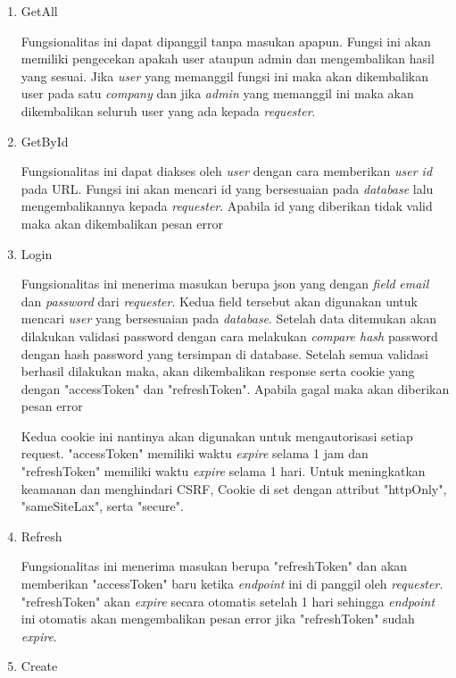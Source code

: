 \begin{enumerate}
  \item GetAll

        Fungsionalitas ini dapat dipanggil tanpa masukan apapun. Fungsi ini akan memiliki pengecekan apakah user ataupun admin dan mengembalikan hasil yang sesuai. Jika \textit{user} yang memanggil fungsi ini maka akan dikembalikan user pada satu \textit{company} dan jika \textit{admin} yang memanggil ini maka akan dikembalikan seluruh user yang ada kepada \textit{requester}.

  \item GetById

        Fungsionalitas ini dapat diakses oleh \textit{user} dengan cara memberikan \textit{user id} pada URL. Fungsi ini akan mencari id yang bersesuaian pada \textit{database} lalu mengembalikannya kepada \textit{requester}. Apabila id yang diberikan tidak valid maka akan dikembalikan pesan error

  \item Login

        Fungsionalitas ini menerima masukan berupa json yang dengan \textit{field} \textit{email} dan \textit{password} dari \textit{requester}. Kedua field tersebut akan digunakan untuk mencari \textit{user} yang bersesuaian pada \textit{database}. Setelah data ditemukan akan dilakukan validasi password dengan cara melakukan \textit{compare hash} password dengan hash password yang tersimpan di database. Setelah semua validasi berhasil dilakukan maka, akan dikembalikan response serta cookie yang dengan "accessToken" dan "refreshToken". Apabila gagal maka akan diberikan pesan error

        Kedua cookie ini nantinya akan digunakan untuk mengautorisasi setiap request. "accessToken" memiliki waktu \textit{expire} selama 1 jam dan "refreshToken" memiliki waktu \textit{expire} selama 1 hari. Untuk meningkatkan keamanan dan menghindari CSRF, Cookie di set dengan attribut "httpOnly", "sameSiteLax", serta "secure".

  \item Refresh

        Fungsionalitas ini menerima masukan berupa "refreshToken" dan akan memberikan "accessToken" baru ketika \textit{endpoint} ini di panggil oleh \textit{requester}. "refreshToken" akan \textit{expire} secara otomatis setelah 1 hari sehingga \textit{endpoint} ini otomatis akan mengembalikan pesan error jika "refreshToken" sudah \textit{expire}.

  \item Create


\end{enumerate}
